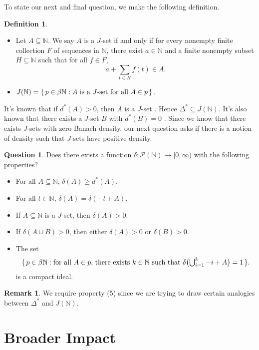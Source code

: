 \documentclass[12pt]{article}
\theoremstyle{plain}
\theoremstyle{definition}
\newtheorem{defn}[thm]{Definition}
\newtheorem{rmk}[thm]{Remark}
\newtheorem{ques}[thm]{Question}
\newcommand{\bbN}{\mathbb{N}}
\begin{document}
To state our next and final question, we make the following definition. 
\begin{defn}
  \begin{itemize}
    \item[(a)] Let $A \subseteq \bbN$. 
      We say $A$ is a $J$-set if and only if for every nonempty finite
      collection $F$ of sequences in $\bbN$, there exist $a \in \bbN$
      and a finite nonempty subset $H \subseteq \bbN$ such that for
      all $f \in F$,
      \[
        a + \sum_{t \in H} f(t) \in A.
      \]
    \item[(b)] $J(\bbN) = \{\, p \in \beta\bbN : \hbox{$A$ is a
        $J$-set for all $A \in p$} \,\}$.
  \end{itemize}
\end{defn}

It's known that if $d^*(A) > 0$, then $A$ is a $J$-set \cite[Theorem
6.10]{Hindman:2009vn}.
Hence $\Delta^* \subseteq J(\bbN)$.   
It's also known that there exists a $J$-set $B$
with $d^*(B) = 0$ \cite[Theorem 2.1]{Hindman:2009ys}.
Since we know that there exists $J$-sets with zero Banach density, our
next question asks if there is a notion of density such that $J$-sets
have positive density.
\begin{ques}
  Does there exists a function $\delta \colon \mathcal{P}(\bbN) \to
  [0, \infty)$ with the following properties? 
  \begin{itemize}
    \item[(1)] For all $A \subseteq \bbN$, $\delta(A) \ge d^*(A)$.
    \item[(2)] For all $t \in \bbN$, $\delta(A) = \delta(-t+A)$.
    \item[(3)] If $A \subseteq \bbN$ is a $J$-set, then $\delta(A) >
      0$.
    \item[(4)] If $\delta(A \cup B) > 0$, then either $\delta(A) >0$
      or $\delta(B) > 0$.
    \item[(5)] The set
      \[
        \{\, p \in \beta\bbN: \hbox{for all $A \in p$, there
          exists $k \in \bbN$} 
        \hbox{ such that $\delta\bigl(\bigcup_{i=1}^k
          -i+A\bigr) = 1$} \,\}.
      \]
      is a compact ideal. 
  \end{itemize}
\end{ques}
\begin{rmk}
  We require property (5) since we are trying to draw certain
  analogies between $\Delta^*$ and $J(\bbN)$. 
\end{rmk}

\section{Broader Impact}
\end{document}
